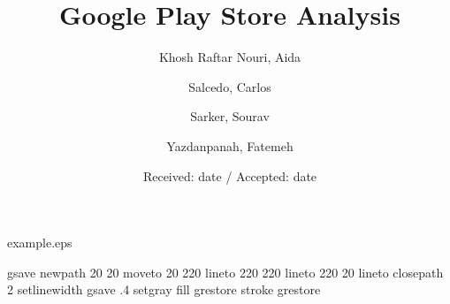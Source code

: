 \begin{filecontents*}{example.eps}

gsave
newpath
  20 20 moveto
  20 220 lineto
  220 220 lineto
  220 20 lineto
closepath
2 setlinewidth
gsave
  .4 setgray fill
grestore
stroke
grestore
\end{filecontents*}
%
\RequirePackage{fix-cm}
%
\documentclass[smallextended]{svjour3}       %
%
\smartqed  %
%
\usepackage{graphicx}
\usepackage{cite}
\usepackage[a4paper]{geometry}



\title{Google Play Store Analysis}%



\author{Khosh Raftar Nouri, Aida        \and
        Salcedo, Carlos \and
Sarker, Sourav \and
Yazdanpanah, Fatemeh} %



\date{Received: date / Accepted: date}


\maketitle


\section*{Introduction to data}

